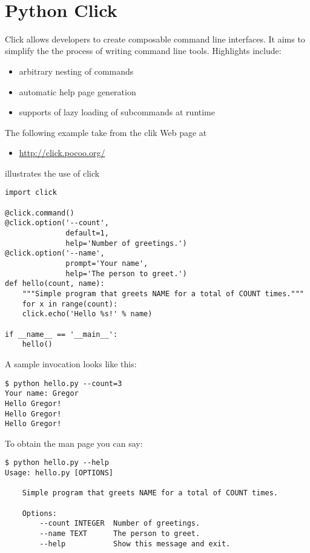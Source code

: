 \MDNAME\

\section{Python Click}

Click allows developers to create composable command line interfaces. It
aims to simplify the the process of writing command line tools.
Highlights include:

\begin{itemize}
\item
  arbitrary nesting of commands
\item
  automatic help page generation
\item
  supports of lazy loading of subcommands at runtime
\end{itemize}

The following example take from the clik Web page at

\begin{itemize}
\item
  \url{http://click.pocoo.org/}
\end{itemize}

illustrates the use of click

\begin{lstlisting}
import click

@click.command()
@click.option('--count', 
              default=1, 
              help='Number of greetings.')
@click.option('--name', 
              prompt='Your name',
              help='The person to greet.')
def hello(count, name):
    """Simple program that greets NAME for a total of COUNT times."""
    for x in range(count):
    click.echo('Hello %s!' % name)

if __name__ == '__main__':
    hello()
\end{lstlisting}

A sample invocation looks like this:

\begin{lstlisting}
$ python hello.py --count=3
Your name: Gregor
Hello Gregor!
Hello Gregor!
Hello Gregor!
\end{lstlisting}

To obtain the man page you can say:

\begin{lstlisting}
$ python hello.py --help
Usage: hello.py [OPTIONS]

    Simple program that greets NAME for a total of COUNT times.

    Options:
        --count INTEGER  Number of greetings.
        --name TEXT      The person to greet.
        --help           Show this message and exit.
\end{lstlisting}

